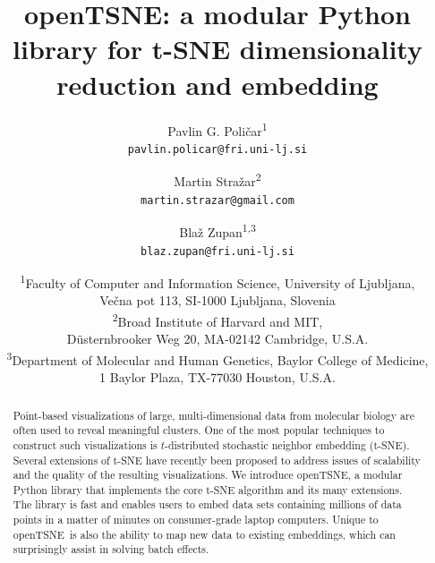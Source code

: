 \documentclass[letter]{article}
\newcommand{\opentsne}{\textsf{openTSNE}}
\begin{document}
\title{openTSNE: a modular Python library for t-SNE dimensionality reduction and embedding}

\author{
  Pavlin G. Poli\v{c}ar\textsuperscript{1}\\
  \texttt{pavlin.policar@fri.uni-lj.si}\\
  \and
  Martin Stra\v{zar}\textsuperscript{2}\\
  \texttt{martin.strazar@gmail.com}\\
  \and
  Bla\v{z} Zupan\textsuperscript{1,3}\\
  \texttt{blaz.zupan@fri.uni-lj.si}\\
}

\date{
  \textsuperscript{1}Faculty of Computer and Information Science, University of Ljubljana,\\
  Ve\v{c}na pot 113, SI-1000 Ljubljana, Slovenia\\ \vspace{2mm}
  \textsuperscript{2}Broad Institute of Harvard and MIT,\\
  D\"{u}sternbrooker Weg 20, MA-02142 Cambridge, U.S.A.\\ \vspace{2mm}
  \textsuperscript{3}Department of Molecular and Human Genetics, Baylor College of Medicine,\\
  1 Baylor Plaza, TX-77030 Houston, U.S.A.
}

\maketitle

\begin{abstract}
Point-based visualizations of large, multi-dimensional data from molecular
biology are often used to reveal meaningful clusters. One of the most popular
techniques to construct such visualizations is $t$-distributed stochastic
neighbor embedding (t-SNE). Several extensions of t\nobreakdash-SNE have
recently been proposed to address issues of scalability and the quality
of the resulting visualizations. We introduce \opentsne, a modular
Python library that implements the core t\nobreakdash-SNE algorithm and its many
extensions.
The library is fast and enables users to embed data sets containing millions of
data points in a matter of minutes on consumer-grade laptop computers.
Unique to \opentsne\ is also the ability to map new data to existing embeddings,
which can surprisingly assist in solving batch effects.
\end{abstract}
\end{document}

